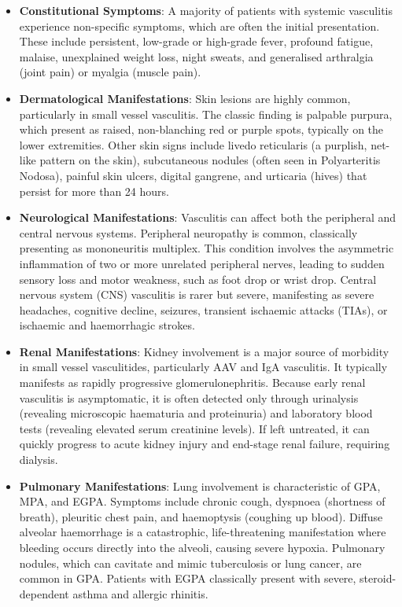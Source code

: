 \begin{itemize}
\item \textbf{Constitutional Symptoms}: A majority of patients with systemic vasculitis experience non-specific symptoms, which are often the initial presentation. These include persistent, low-grade or high-grade fever, profound fatigue, malaise, unexplained weight loss, night sweats, and generalised arthralgia (joint pain) or myalgia (muscle pain).
\item \textbf{Dermatological Manifestations}: Skin lesions are highly common, particularly in small vessel vasculitis. The classic finding is palpable purpura, which present as raised, non-blanching red or purple spots, typically on the lower extremities. Other skin signs include livedo reticularis (a purplish, net-like pattern on the skin), subcutaneous nodules (often seen in Polyarteritis Nodosa), painful skin ulcers, digital gangrene, and urticaria (hives) that persist for more than 24 hours.
\item \textbf{Neurological Manifestations}: Vasculitis can affect both the peripheral and central nervous systems. Peripheral neuropathy is common, classically presenting as mononeuritis multiplex. This condition involves the asymmetric inflammation of two or more unrelated peripheral nerves, leading to sudden sensory loss and motor weakness, such as foot drop or wrist drop. Central nervous system (CNS) vasculitis is rarer but severe, manifesting as severe headaches, cognitive decline, seizures, transient ischaemic attacks (TIAs), or ischaemic and haemorrhagic strokes.
\item \textbf{Renal Manifestations}: Kidney involvement is a major source of morbidity in small vessel vasculitides, particularly AAV and IgA vasculitis. It typically manifests as rapidly progressive glomerulonephritis. Because early renal vasculitis is asymptomatic, it is often detected only through urinalysis (revealing microscopic haematuria and proteinuria) and laboratory blood tests (revealing elevated serum creatinine levels). If left untreated, it can quickly progress to acute kidney injury and end-stage renal failure, requiring dialysis.
\item \textbf{Pulmonary Manifestations}: Lung involvement is characteristic of GPA, MPA, and EGPA. Symptoms include chronic cough, dyspnoea (shortness of breath), pleuritic chest pain, and haemoptysis (coughing up blood). Diffuse alveolar haemorrhage is a catastrophic, life-threatening manifestation where bleeding occurs directly into the alveoli, causing severe hypoxia. Pulmonary nodules, which can cavitate and mimic tuberculosis or lung cancer, are common in GPA. Patients with EGPA classically present with severe, steroid-dependent asthma and allergic rhinitis.

\end{itemize}

